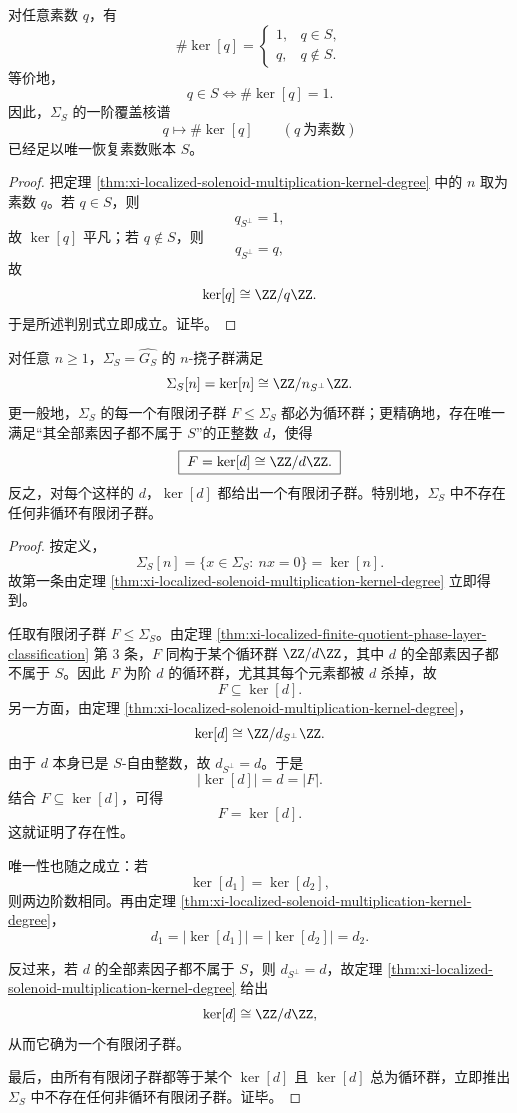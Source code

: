 \begin{corollary}\label{cor:xi-localized-solenoid-prime-kernel-tomography}
对任意素数 \(q\)，有
\[
\#\ker[q]=
\begin{cases}
1,& q\in S,\\[1mm]
q,& q\notin S.
\end{cases}
\]
等价地，
\[
\boxed{\;
q\in S
\iff
\#\ker[q]=1.\;}
\]
因此，\(\Sigma_S\) 的一阶覆盖核谱
\[
q\longmapsto \#\ker[q]
\qquad (q\ \text{为素数})
\]
已经足以唯一恢复素数账本 \(S\)。
\end{corollary}
\begin{proof}
把定理 \ref{thm:xi-localized-solenoid-multiplication-kernel-degree} 中的 \(n\) 取为素数 \(q\)。若 \(q\in S\)，则
\[
q_{S^\perp}=1,
\]
故 \(\ker[q]\) 平凡；若 \(q\notin S\)，则
\[
q_{S^\perp}=q,
\]
故
\[
\ker[q]\cong \ZZ/q\ZZ.
\]
于是所述判别式立即成立。证毕。
\end{proof}

\begin{theorem}\label{thm:xi-localized-solenoid-finite-subgroups-are-kernels}
对任意 \(n\ge 1\)，\(\Sigma_S=\widehat{G_S}\) 的 \(n\)-挠子群满足
\[
\Sigma_S[n]=\ker[n]\cong \ZZ/n_{S^\perp}\ZZ.
\]
更一般地，\(\Sigma_S\) 的每一个有限闭子群 \(F\le \Sigma_S\) 都必为循环群；更精确地，存在唯一满足“其全部素因子都不属于 \(S\)”的正整数 \(d\)，使得
\[
\boxed{\;
F=\ker[d]\cong \ZZ/d\ZZ.\;}
\]
反之，对每个这样的 \(d\)，\(\ker[d]\) 都给出一个有限闭子群。特别地，\(\Sigma_S\) 中不存在任何非循环有限闭子群。
\end{theorem}
\begin{proof}
按定义，
\[
\Sigma_S[n]=\{x\in \Sigma_S:\ nx=0\}=\ker[n].
\]
故第一条由定理 \ref{thm:xi-localized-solenoid-multiplication-kernel-degree} 立即得到。

任取有限闭子群 \(F\le \Sigma_S\)。由定理
\ref{thm:xi-localized-finite-quotient-phase-layer-classification}
第 \(3\) 条，\(F\) 同构于某个循环群 \(\ZZ/d\ZZ\)，其中 \(d\) 的全部素因子都不属于 \(S\)。因此 \(F\) 为阶 \(d\) 的循环群，尤其其每个元素都被 \(d\) 杀掉，故
\[
F\subseteq \ker[d].
\]
另一方面，由定理 \ref{thm:xi-localized-solenoid-multiplication-kernel-degree}，
\[
\ker[d]\cong \ZZ/d_{S^\perp}\ZZ.
\]
由于 \(d\) 本身已是 \(S\)-自由整数，故 \(d_{S^\perp}=d\)。于是
\[
|\ker[d]|=d=|F|.
\]
结合 \(F\subseteq \ker[d]\)，可得
\[
F=\ker[d].
\]
这就证明了存在性。

唯一性也随之成立：若
\[
\ker[d_1]=\ker[d_2],
\]
则两边阶数相同。再由定理 \ref{thm:xi-localized-solenoid-multiplication-kernel-degree}，
\[
d_1=|\ker[d_1]|=|\ker[d_2]|=d_2.
\]

反过来，若 \(d\) 的全部素因子都不属于 \(S\)，则 \(d_{S^\perp}=d\)，故定理
\ref{thm:xi-localized-solenoid-multiplication-kernel-degree}
给出
\[
\ker[d]\cong \ZZ/d\ZZ,
\]
从而它确为一个有限闭子群。

最后，由所有有限闭子群都等于某个 \(\ker[d]\) 且 \(\ker[d]\) 总为循环群，立即推出 \(\Sigma_S\) 中不存在任何非循环有限闭子群。证毕。
\end{proof}

